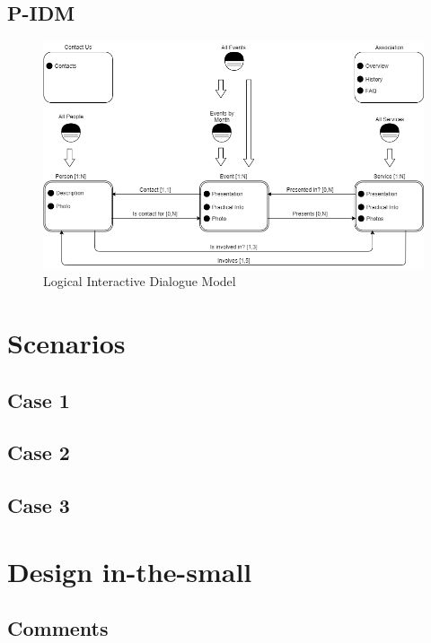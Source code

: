 \documentclass[11pt, a4paperm, hidelinks]{article}
\begin{document}
	\subsection{P-IDM}
	\begin{figure}[h!]
		\centering
		\begin{minipage}[b]{1\textwidth}
    			\includegraphics[width=\textwidth]{./assets/L-IDM.png}
			\caption{Logical Interactive Dialogue Model}
		\end{minipage}
	\end{figure}
	\clearpage


	\section{Scenarios}

	\subsection{Case 1}

	\subsection{Case 2}

	\subsection{Case 3}
	\clearpage


	\section{Design in-the-small}

	\subsection{Comments}
\end{document}
